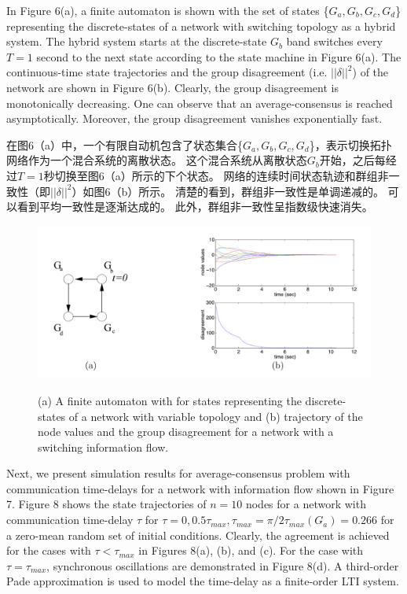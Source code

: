 \documentclass{article}
\begin{document}
{\color[gray]{0.5}
In Figure 6(a), a ﬁnite automaton is shown with the set of states \{$G_a, G_b, G_c, G_d$\} representing the discrete-states of a network with switching topology as a hybrid system. 
The hybrid system starts at the discrete-state $G_b$ band switches every $T=1$ second to the next state according to the state machine in Figure 6(a). 
The continuous-time state trajectories and the group disagreement (i.e. $||\delta||^2$) of the network are shown in Figure 6(b). 
Clearly, the group disagreement is monotonically decreasing. 
One can observe that an average-consensus is reached asymptotically. 
Moreover, the group disagreement vanishes exponentially fast.
}

在图6（a）中，一个有限自动机包含了状态集合\{$G_a, G_b, G_c, G_d$\}，表示切换拓扑网络作为一个混合系统的离散状态。
这个混合系统从离散状态$G_b$开始，之后每经过$T=1$秒切换至图6（a）所示的下个状态。
网络的连续时间状态轨迹和群组非一致性（即$||\delta||^2$）如图6（b）所示。
清楚的看到，群组非一致性是单调递减的。
可以看到平均一致性是逐渐达成的。
此外，群组非一致性呈指数级快速消失。

\begin{figure}[htbp]
    \centering
    \includegraphics[width=14.5cm]{figures/Fig6-Automaton.jpeg}
    \label{Automaton}
    \caption{(a) A finite automaton with for states representing the discrete-states of a network with variable topology and (b) trajectory of the node values and the group disagreement for a network with a switching information flow.}
\end{figure}

{\color[gray]{0.5}
Next, we present simulation results for average-consensus problem with communication time-delays for a network with information ﬂow shown in Figure 7. 
Figure 8 shows the state trajectories of $n=10$ nodes for a network with communication time-delay $\tau$ for $\tau=0, 0.5\tau_{max}, \tau_{max} = \pi / 2\tau_{max}(G_a) = 0.266$ for a zero-mean random set of initial conditions. 
Clearly, the agreement is achieved for the cases with $\tau < \tau_{max}$ in Figures 8(a), (b), and (c). 
For the case with $\tau = \tau_{max}$, synchronous oscillations are demonstrated in Figure 8(d). 
A third-order Pade approximation is used to model the time-delay as a ﬁnite-order LTI system.
}
\end{document}

